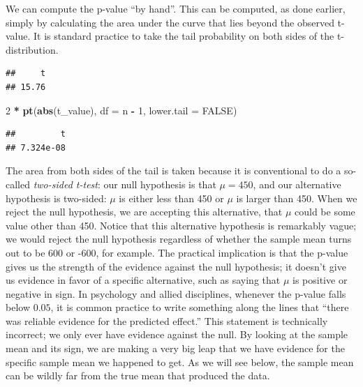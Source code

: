 \documentclass[12pt,]{krantz}
\newenvironment{Shaded}{\begin{snugshade}}{\end{snugshade}}
\newcommand{\DataTypeTok}[1]{\textcolor[rgb]{0.13,0.29,0.53}{#1}}
\newcommand{\DecValTok}[1]{\textcolor[rgb]{0.00,0.00,0.81}{#1}}
\newcommand{\KeywordTok}[1]{\textcolor[rgb]{0.13,0.29,0.53}{\textbf{#1}}}
\newcommand{\NormalTok}[1]{#1}
\newcommand{\OperatorTok}[1]{\textcolor[rgb]{0.81,0.36,0.00}{\textbf{#1}}}
\newcommand{\OtherTok}[1]{\textcolor[rgb]{0.56,0.35,0.01}{#1}}
\newcommand{\StringTok}[1]{\textcolor[rgb]{0.31,0.60,0.02}{#1}}
\begin{document}
We can compute the p-value ``by hand''. This can be computed, as done earlier, simply by calculating the area under the curve that lies beyond the observed t-value. It is standard practice to take the tail probability on both sides of the t-distribution.

\begin{Shaded}
\end{Shaded}

\begin{verbatim}
##     t 
## 15.76
\end{verbatim}

\begin{Shaded}
\begin{Highlighting}[]
\DecValTok{2} \OperatorTok{*}\StringTok{ }\KeywordTok{pt}\NormalTok{(}\KeywordTok{abs}\NormalTok{(t_value), }\DataTypeTok{df =}\NormalTok{ n }\OperatorTok{-}\StringTok{ }\DecValTok{1}\NormalTok{, }\DataTypeTok{lower.tail =} \OtherTok{FALSE}\NormalTok{)}
\end{Highlighting}
\end{Shaded}

\begin{verbatim}
##         t 
## 7.324e-08
\end{verbatim}

The area from both sides of the tail is taken because it is conventional to do a so-called \emph{two-sided t-test}: our null hypothesis is that \(\mu=450\), and our alternative hypothesis is two-sided: \(\mu\) is either less than 450 or \(\mu\) is larger than 450. When we reject the null hypothesis, we are accepting this alternative, that \(\mu\) could be some value other than 450. Notice that this alternative hypothesis is remarkably vague; we would reject the null hypothesis regardless of whether the sample mean turns out to be 600 or -600, for example. The practical implication is that the p-value gives us the strength of the evidence against the null hypothesis; it doesn't give us evidence in favor of a specific alternative, such as saying that \(\mu\) is positive or negative in sign. In psychology and allied disciplines, whenever the p-value falls below \(0.05\), it is common practice to write something along the lines that ``there was reliable evidence for the predicted effect.'' This statement is technically incorrect; we only ever have evidence against the null. By looking at the sample mean and its sign, we are making a very big leap that we have evidence for the specific sample mean we happened to get. As we will see below, the sample mean can be wildly far from the true mean that produced the data.
\end{document}
